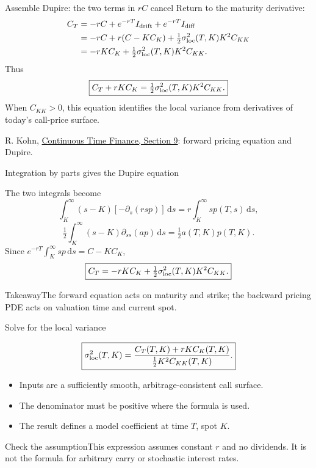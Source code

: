 \documentclass[handout,10pt,t,aspectratio=169]{beamer}
\newenvironment{keybox}{\begin{exampleblock}{Takeaway}}{\end{exampleblock}}
\newenvironment{watchbox}{\begin{alertblock}{Check the assumption}}{\end{alertblock}}
\newcommand{\dd}{\,\mathrm d}
\newcommand{\source}[1]{\vfill{\scriptsize\color{gray}#1\par}}
\begin{document}
\begin{frame}{Assemble Dupire: the two terms in \(rC\) cancel}
\small
Return to the maturity derivative:
\[
\begin{aligned}
C_T
&=-rC+e^{-rT}I_{\rm drift}+e^{-rT}I_{\rm diff}\\
&=-rC+r(C-KC_K)+\tfrac12\sigma_{\rm loc}^2(T,K)K^2 C_{KK}\\
&=-rK C_K+\tfrac12\sigma_{\rm loc}^2(T,K)K^2 C_{KK}.
\end{aligned}
\]
Thus
\[
\boxed{C_T+rK C_K=\tfrac12\sigma_{\rm loc}^2(T,K)K^2 C_{KK}.}
\]
When \(C_{KK}>0\), this equation identifies the local variance from
derivatives of today's call-price surface.
\source{R. Kohn, \href{https://math.nyu.edu/faculty/kohn/cont-time-finance/section9.pdf}{Continuous Time Finance, Section 9}: forward pricing equation and Dupire.}
\end{frame}

\begin{frame}{Integration by parts gives the Dupire equation}

    The two integrals become
    \[\int_K^\infty(s-K)[-\partial_s(rsp)]\dd s
       =r\int_K^\infty s p(T,s)\dd s,\]
    \[\tfrac12\int_K^\infty(s-K)\partial_{ss}(ap)\dd s
       =\tfrac12 a(T,K)p(T,K).\]
    Since \(e^{-rT}\int_K^\infty s p\dd s=C-KC_K\),
    \[\boxed{C_T=-rK C_K+\tfrac12\sigma_{\rm loc}^2(T,K)K^2C_{KK}.}\]
    \begin{keybox}The forward equation acts on maturity and strike;
    the backward pricing PDE acts on valuation time and current spot.\end{keybox}
\end{frame}

\begin{frame}{Solve for the local variance}

    \[\boxed{\sigma_{\rm loc}^2(T,K)
        =\frac{C_T(T,K)+rKC_K(T,K)}{\tfrac12K^2C_{KK}(T,K)}.}\]
    \begin{itemize}
    \item Inputs are a sufficiently smooth, arbitrage-consistent call surface.
    \item The denominator must be positive where the formula is used.
    \item The result defines a model coefficient at time \(T\), spot \(K\).
    \end{itemize}
    \begin{watchbox}This expression assumes constant \(r\) and no dividends.
    It is not the formula for arbitrary carry or stochastic interest rates.\end{watchbox}
\end{frame}
\end{document}
